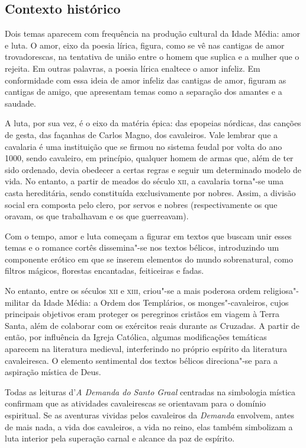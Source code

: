\subsection{Contexto histórico}

Dois temas aparecem com frequência na produção cultural da Idade Média: amor e luta. O amor, eixo da poesia lírica, figura, como se vê nas cantigas
de amor trovadorescas, na tentativa de união entre o homem que suplica e
a mulher que o rejeita. Em outras palavras, a poesia lírica enaltece o
amor infeliz. Em conformidade com essa ideia de amor infeliz das
cantigas de amor, figuram as cantigas de amigo, que apresentam temas
como a separação dos amantes e a saudade.

A luta, por sua vez, é o eixo da matéria épica: das epopeias
nórdicas, das canções de gesta, das façanhas de Carlos Magno, dos
cavaleiros. Vale lembrar que a cavalaria é uma instituição que se firmou
no sistema feudal por volta do ano 1000, sendo cavaleiro, em princípio,
qualquer homem de armas que, além de ter sido ordenado, devia obedecer a
certas regras e seguir um determinado modelo de vida. No entanto, a
partir de meados do século \textsc{xii}, a cavalaria torna"-se uma casta
hereditária, sendo constituída exclusivamente por nobres. Assim, a
divisão social era composta pelo clero, por servos e nobres
(respectivamente os que oravam, os que trabalhavam e os que
guerreavam).

Com o tempo, amor e luta começam a figurar em textos que buscam
unir esses temas e o romance cortês dissemina"-se nos textos bélicos,
introduzindo um componente erótico em que se inserem elementos do mundo
sobrenatural, como filtros mágicos, florestas encantadas, feiticeiras e
fadas.

No entanto, entre os séculos \textsc{xii} e \textsc{xiii}, criou"-se a mais
poderosa ordem religiosa"-militar da Idade Média: a Ordem dos Templários,
os monges"-cavaleiros, cujos principais objetivos eram proteger os
peregrinos cristãos em viagem à Terra Santa, além de colaborar com os
exércitos reais durante as Cruzadas. A partir de então, por influência
da Igreja Católica, algumas modificações temáticas aparecem na
literatura medieval, interferindo no próprio espírito da literatura
cavaleiresca. O elemento sentimental dos textos bélicos direciona"-se
para a aspiração mística de Deus.

Todas as leituras d'\emph{A Demanda do Santo
Graal} centradas na simbologia mística confirmam que as atividades
cavaleirescas se orientavam para o domínio espiritual. Se as aventuras
vividas pelos cavaleiros da \emph{Demanda} envolvem, antes de mais nada,
a vida dos cavaleiros, a vida no reino, elas também simbolizam a luta
interior pela superação carnal e alcance da paz de
espírito.


